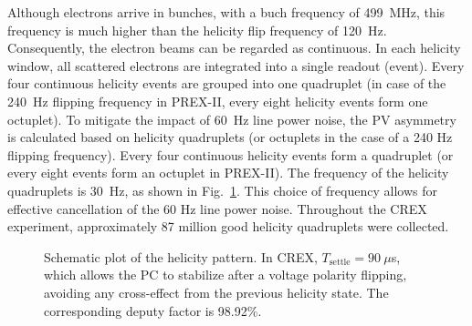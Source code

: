 Although electrons arrive in bunches, with a buch frequency of 499~MHz, this frequency
is much higher than the helicity flip frequency of 120~Hz. Consequently, 
the electron beams can be regarded as continuous. In each helicity window, all 
scattered electrons are integrated into a single readout (event).
Every four continuous helicity events are grouped into one quadruplet
(in case of the 240~Hz flipping frequency in PREX-II, every eight helicity events 
form one octuplet).
To mitigate the impact of 60~Hz line power noise, the PV asymmetry is calculated based on helicity quadruplets (or octuplets in the case of a 240 Hz flipping frequency). Every four continuous helicity events form a quadruplet (or every eight events form an octuplet in PREX-II).
The frequency of the helicity quadruplets is 30~Hz, as shown in Fig.~\ref{fig:helicity_pattern}. This choice of frequency allows for effective cancellation of the 60 Hz line power noise. Throughout the CREX experiment, approximately 87 million good helicity quadruplets were collected.
\begin{figure}[!h]
    \centering
    \caption[Helicity pattern]
    {Schematic plot of the helicity pattern. In CREX, $T_{\text{settle}} = 90\ \mu$s, 
    which allows the PC to stabilize after a voltage polarity flipping, avoiding 
    any cross-effect from the previous helicity state. The corresponding deputy factor 
    is 98.92\%.}
    \label{fig:helicity_pattern}
\end{figure}

